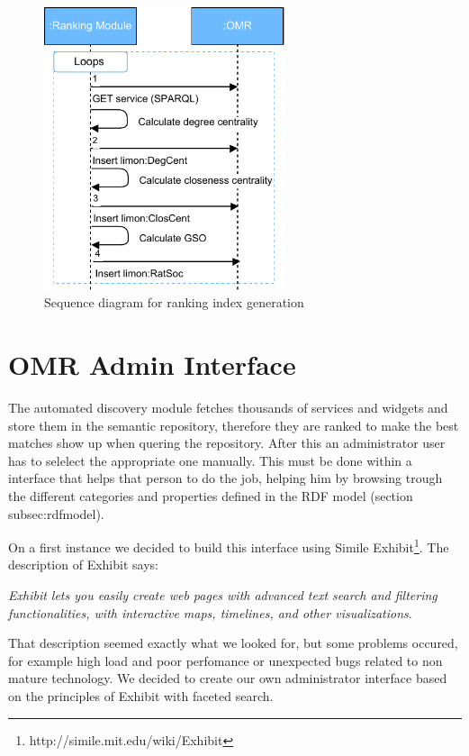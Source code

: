 \begin{figure}[h]
	\centering
	\includegraphics[width=200pt]{graphics/Diagrama_secuencia_ranking.pdf}
	\caption{Sequence diagram for ranking index generation}
	\label{fig:rankingsequence}
\end{figure}

\section{OMR Admin Interface}
\label{sec:omradmin}
The automated discovery module fetches thousands of services and widgets and store them in the semantic repository, therefore they are ranked to make the best matches show up when quering the repository. After this an administrator user has to selelect the appropriate one manually. This must be done within a interface that helps that person to do the job, helping him by browsing trough the different categories and properties defined in the RDF model (section subsec:rdfmodel).

On a first instance we decided to build this interface using Simile Exhibit\footnote{http://simile.mit.edu/wiki/Exhibit}. The description of Exhibit says:

\textit{Exhibit lets you easily create web pages with advanced text search and filtering functionalities, with interactive maps, timelines, and other visualizations}.

That description seemed exactly what we looked for, but some problems occured, for example high load and poor perfomance or unexpected bugs related to non mature technology. We decided to create our own administrator interface based on the principles of Exhibit with faceted search.

